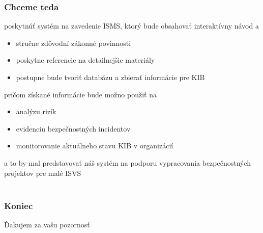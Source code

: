 \documentclass{beamer}
\begin{document}
\begin{frame}
    \frametitle{Chceme teda}
    poskytnúť systém na zavedenie ISMS, ktorý bude obsahovať interaktívny návod a
    \begin{itemize}
        \item stručne zdôvodní zákonné povinnosti
        \item poskytne referencie na detailnejšie materiály
        \item postupne bude tvoriť databázu a zbierať informácie pre KIB
    \end{itemize}
    pričom získané informácie bude možno použiť na
    \begin{itemize}
        \item analýzu rizík
        \item evidenciu bezpečnostných incidentov
        \item monitorovanie aktuálneho stavu KIB v organizácií
    \end{itemize}
    a to by mal predstavovať náš systém na podporu vypracovania bezpečnostných projektov pre malé ISVS \\ \\
\end{frame}
\begin{frame}
    \frametitle{Koniec}
    Ďakujem za vašu pozornosť
\end{frame}
\end{document}
